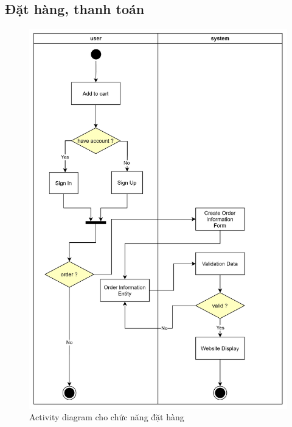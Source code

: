 \subsection{Đặt hàng, thanh toán}
\begin{figure}[h]
    \centering
    \includegraphics[scale = 0.12]{img/activity/order.png}
    \vspace{1cm}
    \caption{Activity diagram cho chức năng đặt hàng}
    \label{fig:taskAssignment}
\end{figure}

